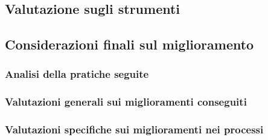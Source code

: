 \documentclass[italian,12pt]{article} %
\begin{document}
\subsection*{Valutazione sugli strumenti}

\subsection{Considerazioni finali sul miglioramento}

\subsubsection{Analisi della pratiche seguite}

\subsubsection{Valutazioni generali sui miglioramenti conseguiti}

\subsubsection{Valutazioni specifiche sui miglioramenti nei processi}


\end{document}
